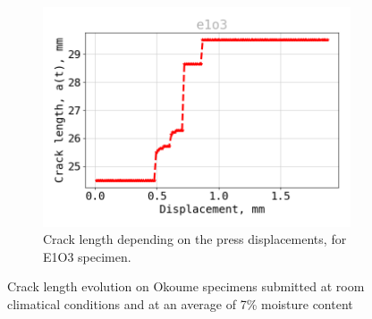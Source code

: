 \begin{figure}[H]
\begin{subfigure}{0.48\linewidth}
	\centering
	\includegraphics[width=\textwidth]{Figures/e1o3_a}
	\decoRule
	\caption[Crack length E1O3]{Crack length depending on the press displacements, for E1O3 specimen.}
	\label{fig:E1O3_a}
\end{subfigure}
\caption{Crack length evolution on Okoume specimens submitted at room climatical conditions and at an average of 7\% moisture content}
\label{E1o_a}
\end{figure}

